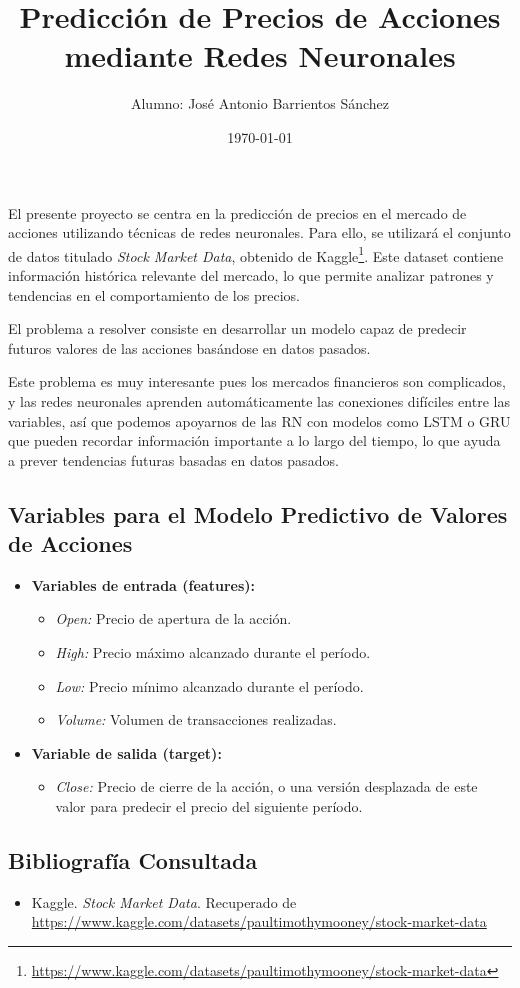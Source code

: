 \documentclass[10pt]{article}
\title{Predicción de Precios de Acciones mediante Redes Neuronales}
\author{Alumno: José Antonio Barrientos Sánchez}
\date{\today}
\begin{document}
\maketitle

El presente proyecto se centra en la predicción de precios en el mercado de acciones utilizando técnicas de redes neuronales. Para ello, se utilizará el conjunto de datos titulado \emph{Stock Market Data}, obtenido de Kaggle\footnote{\url{https://www.kaggle.com/datasets/paultimothymooney/stock-market-data}}. Este dataset contiene información histórica relevante del mercado, lo que permite analizar patrones y tendencias en el comportamiento de los precios.

El problema a resolver consiste en desarrollar un modelo capaz de predecir futuros valores de las acciones basándose en datos pasados. 

Este problema es muy interesante pues los mercados financieros son complicados, y las redes neuronales aprenden automáticamente las conexiones difíciles entre las variables, así que podemos apoyarnos de las RN con modelos como LSTM o GRU que pueden recordar información importante a lo largo del tiempo, lo que ayuda a prever tendencias futuras basadas en datos pasados.

\subsection*{Variables para el Modelo Predictivo de Valores de Acciones}

\begin{itemize}
    \item \textbf{Variables de entrada (features):}
    \begin{itemize}
        \item \textit{Open:} Precio de apertura de la acción.
        \item \textit{High:} Precio máximo alcanzado durante el período.
        \item \textit{Low:} Precio mínimo alcanzado durante el período.
        \item \textit{Volume:} Volumen de transacciones realizadas.
    \end{itemize}
    \item \textbf{Variable de salida (target):}
    \begin{itemize}
        \item \textit{Close:} Precio de cierre de la acción, o una versión desplazada de este valor para predecir el precio del siguiente período.
    \end{itemize}
\end{itemize}


\subsection*{Bibliografía Consultada}
\begin{itemize}
    \item Kaggle. \textit{Stock Market Data}. Recuperado de \url{https://www.kaggle.com/datasets/paultimothymooney/stock-market-data}
\end{itemize}
\end{document}
